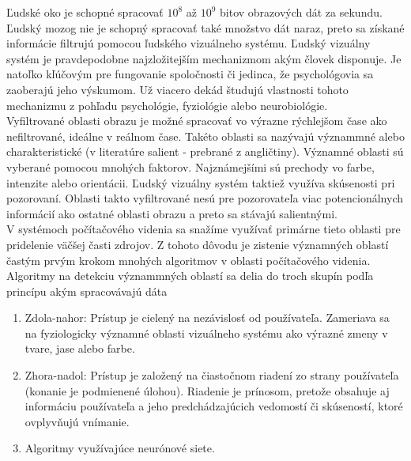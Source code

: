
Ľudské oko je schopné spracovať \begin{math}10^8\end{math} až \begin{math}10^9\end{math} bitov obrazových dát za sekundu.
Ľudský mozog nie je schopný spracovať také množstvo dát naraz, preto sa získané informácie filtrujú pomocou ľudského vizuálneho systému\cite{Fmph-videnie}.
Ľudský vizuálny systém je pravdepodobne najzložitejším mechanizmom akým človek disponuje.
Je natoľko kľúčovým pre fungovanie spoločnosti či jedinca, že psychológovia sa zaoberajú jeho výskumom.
Už viacero dekád študujú vlastnosti tohoto mechanizmu z pohľadu psychológie, fyziológie alebo neurobiológie.
\\
Vyfiltrované oblasti obrazu je možné spracovať vo výrazne rýchlejšom čase ako nefiltrované, ideálne v reálnom čase.
Takéto oblasti sa nazývajú význammné alebo charakteristické (v literatúre salient - prebrané z angličtiny).
Významné oblasti sú vyberané pomocou mnohých faktorov.
Najznámejšími sú prechody vo farbe, intenzite alebo orientácii.
Ľudský vizuálny systém taktiež využíva skúsenosti pri pozorovaní.
Oblasti takto vyfiltrované nesú pre pozorovateľa viac potencionálnych informácií ako ostatné oblasti obrazu a preto sa stávajú salientnými.
\\
V systémoch počítačového videnia sa snažíme využívať primárne tieto oblasti pre pridelenie väčšej časti zdrojov.
Z tohoto dôvodu je zistenie významných oblastí častým prvým krokom mnohých algoritmov v oblasti počítačového videnia.
\\
Algoritmy na detekciu význammných oblastí sa delia do troch skupín podľa princípu akým spracovávajú dáta\cite{brief-survey}

  \begin{enumerate}
          \item Zdola-nahor: Prístup je cielený na nezávislosť od používateľa.
          Zameriava sa na fyziologicky významné oblasti vizuálneho systému ako výrazné zmeny v tvare, jase alebo farbe.
          \item Zhora-nadol: Prístup je založený na čiastočnom riadení zo strany používateľa (konanie je podmienené úlohou).
          Riadenie je prínosom, pretože obsahuje aj informáciu používateľa a jeho predchádzajúcich vedomostí či skúseností, ktoré ovplyvňujú vnímanie.
          \item Algoritmy využívajúce neurónové siete.
  \end{enumerate}

